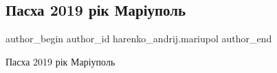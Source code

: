  
 
 
 
 

\subsection{Пасха 2019 рік Маріуполь}
\label{sec:24_04_2022.fb.harenko_andrij.mariupol.1.pasha_2019_rik_mariupol}

\ifcmt
 author_begin
   author_id harenko_andrij.mariupol
 author_end
\fi

Пасха 2019 рік Маріуполь
